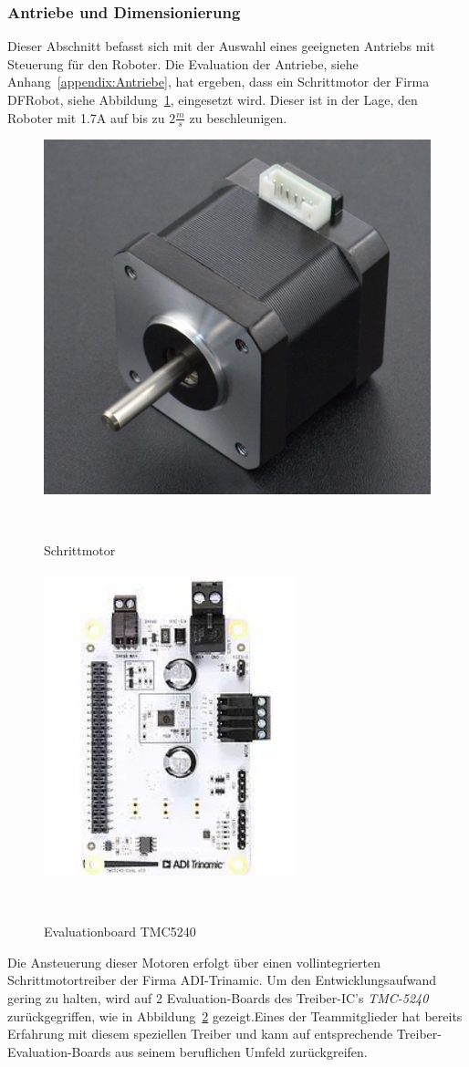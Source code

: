 \documentclass[main.tex]{subfiles} %
\begin{document}

\subsubsection{Antriebe und Dimensionierung}

Dieser Abschnitt befasst sich mit der Auswahl eines geeigneten Antriebs mit
Steuerung für den Roboter. Die Evaluation der Antriebe, siehe
Anhang~\ref{appendix:Antriebe}, hat ergeben, dass ein Schrittmotor der Firma
DFRobot, siehe Abbildung~\ref{Schrittmotor_FIT0278}, eingesetzt wird. Dieser
ist in der Lage, den Roboter mit 1.7A auf bis zu $2\frac{m}{s}$ zu
beschleunigen.
\begin{figure}[H]
    \centering
    \includegraphics[width = 0.25 \linewidth]{fig_Antriebe_und_Dimensionierung/DFRobot_Stepper_FIT0278.png}
    \caption{Schrittmotor}~\label{Schrittmotor_FIT0278}
\end{figure}

\begin{figure}[H]
    \centering
    \includegraphics[width = 0.25 \linewidth]{fig_Antriebe_und_Dimensionierung/TMC_5240_EVAL.png}
    \caption{Evaluationboard TMC5240}~\label{Schrittmotorentreiber_EVAL}
\end{figure}

Die Ansteuerung dieser Motoren erfolgt über einen vollintegrierten
Schrittmotortreiber der Firma ADI-Trinamic. Um den Entwicklungsaufwand gering
zu halten, wird auf 2 Evaluation-Boards des Treiber-IC's \textit{TMC-5240}
zurückgegriffen, wie in Abbildung~\ref{Schrittmotorentreiber_EVAL}
gezeigt.Eines der Teammitglieder hat bereits Erfahrung mit diesem speziellen
Treiber und kann auf entsprechende Treiber-Evaluation-Boards aus seinem
beruflichen Umfeld zurückgreifen.
\end{document}
